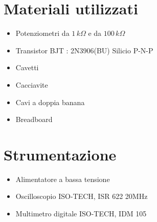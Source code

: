 \documentclass[]{article}
\begin{document}
\section{Materiali utilizzati}
\begin{itemize}
	\item Potenziometri da $ 1 \,k\Omega $ e da $ 100 \,k\Omega $
	\item Transistor BJT : 2N3906(BU) Silicio P-N-P
	\item Cavetti
	\item Cacciavite
	\item Cavi a doppia banana
	\item Breadboard
\end{itemize}
\section{Strumentazione}
\begin{itemize}
	\item Alimentatore a bassa tensione
	\item Oscilloscopio ISO-TECH, ISR 622 20MHz
	\item Multimetro digitale ISO-TECH, IDM 105
\end{itemize}
\end{document}

